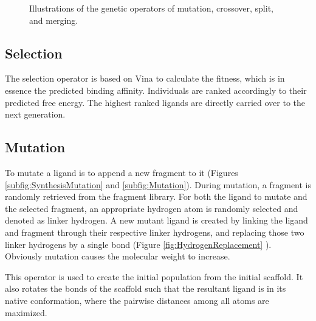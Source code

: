 \begin{figure}
{  \label{subfig:Split}
}
\caption{Illustrations of the genetic operators of mutation, crossover, split, and merging.}
\label{fig:GeneticOperators}
\end{figure}

\subsection{Selection}

The selection operator is based on Vina to calculate the fitness, which is in essence the predicted binding affinity. Individuals are ranked accordingly to their predicted free energy. The highest ranked ligands are directly carried over to the next generation.

\subsection{Mutation}

To mutate a ligand is to append a new fragment to it (Figures \ref{subfig:SynthesisMutation} and \ref{subfig:Mutation}). During mutation, a fragment is randomly retrieved from the fragment library. For both the ligand to mutate and the selected fragment, an appropriate hydrogen atom is randomly selected and denoted as linker hydrogen. A new mutant ligand is created by linking the ligand and fragment through their respective linker hydrogens, and replacing those two linker hydrogens by a single bond (Figure \ref{fig:HydrogenReplacement} \citep{325-2009}). Obviously mutation causes the molecular weight to increase.

This operator is used to create the initial population from the initial scaffold. It also rotates the bonds of the scaffold such that the resultant ligand is in its native conformation, where the pairwise distances among all atoms are maximized.

